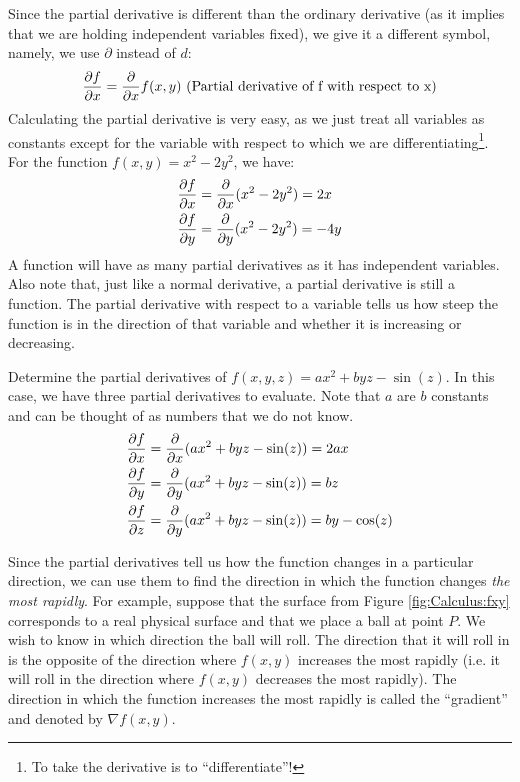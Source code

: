  Since the partial derivative is different than the ordinary derivative (as it implies that we are holding independent variables fixed), we give it a different symbol, namely, we use $\partial$ instead of $d$:
\begin{align*}
\frac{\partial f}{\partial x}=\frac{\partial }{\partial x}f(x,y)\text{ (Partial derivative of f with respect to x)}
\end{align*}
Calculating the partial derivative is very easy, as we just treat all variables as constants except for the variable with respect to which we are differentiating\footnote{To take the derivative is to ``differentiate''!}. For the function $f(x,y)=x^2-2y^2$, we have:
\begin{align*}
\frac{\partial f}{\partial x}&=\frac{\partial }{\partial x}(x^2-2y^2) = 2x\\
\frac{\partial f}{\partial y}&=\frac{\partial }{\partial y}(x^2-2y^2) = -4y
\end{align*}
A function will have as many partial derivatives as it has independent variables. Also note that, just like a normal derivative, a partial derivative is still a function. The partial derivative with respect to a variable tells us how steep the function is in the direction of that variable and whether it is increasing or decreasing.

\begin{example}{Determine the partial derivatives of $f(x,y,z)=ax^2+byz-\sin(z)$.}
In this case, we have three partial derivatives to evaluate. Note that $a$ are $b$ constants and can be thought of as numbers that we do not know.
\label{ex:Calculus:partials}
\begin{align*}
\frac{\partial f}{\partial x}&=\frac{\partial }{\partial x}(ax^2+byz-\sin(z)) = 2ax\\
\frac{\partial f}{\partial y}&=\frac{\partial }{\partial y}(ax^2+byz-\sin(z)) = bz \\
\frac{\partial f}{\partial z}&=\frac{\partial }{\partial y}(ax^2+byz-\sin(z)) = by-\cos(z) 
\end{align*} 
\end{example}

Since the partial derivatives tell us how the function changes in a particular direction, we can use them to find the direction in which the function changes \textit{the most rapidly}. For example, suppose that the surface from Figure \ref{fig:Calculus:fxy} corresponds to a real physical surface and that we place a ball at point $P$. We wish to know in which direction the ball will roll. The direction that it will roll in is the opposite of the direction where $f(x,y)$ increases the most rapidly (i.e. it will roll in the direction where $f(x,y)$ decreases the most rapidly). The direction in which the function increases the most rapidly is called the ``gradient'' and denoted by $\nabla f(x,y)$.

